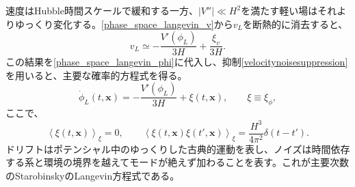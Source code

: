 \documentclass[a4paper,11pt,oneside]{article}
\theoremstyle{definition}
\numberwithin{equation}{section}
\begin{document}
速度はHubble時間スケールで緩和する一方、\(|V''|\ll H^{2}\)を満たす軽い場はそれよりゆっくり変化する。\eqref{phase_space_langevin_v}から\(v_{L}\)を断熱的に消去すると、
\begin{equation}
v_{L}
\simeq
-\frac{V'(\phi_{L})}{3H}
+
\frac{\xi_{v}}{3H}.
\end{equation}
この結果を\eqref{phase_space_langevin_phi}に代入し、抑制\eqref{velocitynoisesuppression}を用いると、主要な確率的方程式を得る。
\begin{equation}
\dot{\phi}_{L}(t,\mathbf{x})
=
-\frac{V'(\phi_{L})}{3H}
+
\xi(t,\mathbf{x}),
\qquad
\xi\equiv\xi_{\phi},
\label{stochasticinflationlangevin}
\end{equation}
ここで、
\begin{equation}
\left\langle
\xi(t,\mathbf{x})
\right\rangle_{\xi}
=
0,
\qquad
\left\langle
\xi(t,\mathbf{x})
\xi(t',\mathbf{x})
\right\rangle_{\xi}
=
\frac{H^{3}}{4\pi^{2}}
\delta(t-t').
\label{stochasticinflationnoise}
\end{equation}
ドリフトはポテンシャル中のゆっくりした古典的運動を表し、ノイズは時間依存する系と環境の境界を越えてモードが絶えず加わることを表す。これが主要次数のStarobinskyのLangevin方程式である\cite{Starobinsky:1986fx,Starobinsky:1994bd}。
\end{document}
